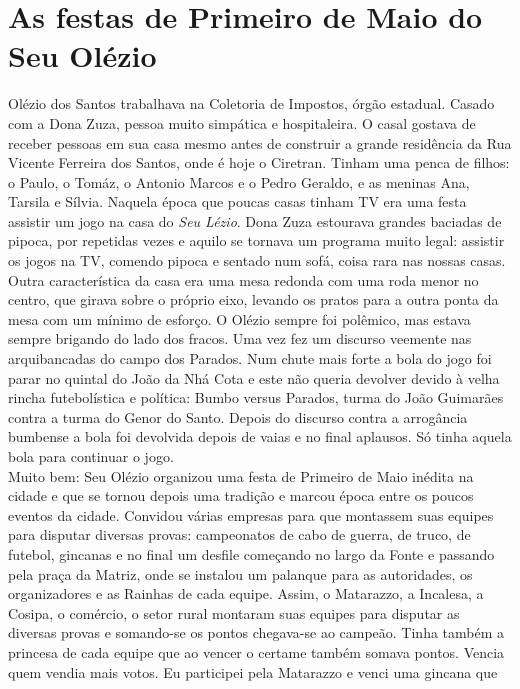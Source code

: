 \documentclass[12pt,brazil,]{book}
\begin{document}
\section{As festas de Primeiro de Maio do Seu
Olézio}\label{as-festas-de-primeiro-de-maio-do-seu-oluxe9zio}

Olézio dos Santos trabalhava na Coletoria de Impostos, órgão estadual.
Casado com a Dona Zuza, pessoa muito simpática e hospitaleira. O casal
gostava de receber pessoas em sua casa mesmo antes de construir a grande
residência da Rua Vicente Ferreira dos Santos, onde é hoje o Ciretran.
Tinham uma penca de filhos: o Paulo, o Tomáz, o Antonio Marcos e o Pedro
Geraldo, e as meninas Ana, Tarsila e Sílvia. Naquela época que poucas
casas tinham TV era uma festa assistir um jogo na casa do \emph{Seu
Lézio}. Dona Zuza estourava grandes baciadas de pipoca, por repetidas
vezes e aquilo se tornava um programa muito legal: assistir os jogos na
TV, comendo pipoca e sentado num sofá, coisa rara nas nossas casas.
Outra característica da casa era uma mesa redonda com uma roda menor no
centro, que girava sobre o próprio eixo, levando os pratos para a outra
ponta da mesa com um mínimo de esforço. O Olézio sempre foi polêmico,
mas estava sempre brigando do lado dos fracos. Uma vez fez um discurso
veemente nas arquibancadas do campo dos Parados. Num chute mais forte a
bola do jogo foi parar no quintal do João da Nhá Cota e este não queria
devolver devido à velha rincha futebolística e política: Bumbo versus
Parados, turma do João Guimarães contra a turma do Genor do Santo.
Depois do discurso contra a arrogância bumbense a bola foi devolvida
depois de vaias e no final aplausos. Só tinha aquela bola para continuar
o jogo.\\
Muito bem: Seu Olézio organizou uma festa de Primeiro de Maio inédita na
cidade e que se tornou depois uma tradição e marcou época entre os
poucos eventos da cidade. Convidou várias empresas para que montassem
suas equipes para disputar diversas provas: campeonatos de cabo de
guerra, de truco, de futebol, gincanas e no final um desfile começando
no largo da Fonte e passando pela praça da Matriz, onde se instalou um
palanque para as autoridades, os organizadores e as Rainhas de cada
equipe. Assim, o Matarazzo, a Incalesa, a Cosipa, o comércio, o setor
rural montaram suas equipes para disputar as diversas provas e
somando-se os pontos chegava-se ao campeão. Tinha também a princesa de
cada equipe que ao vencer o certame também somava pontos. Vencia quem
vendia mais votos. Eu participei pela Matarazzo e venci uma gincana que
\end{document}
